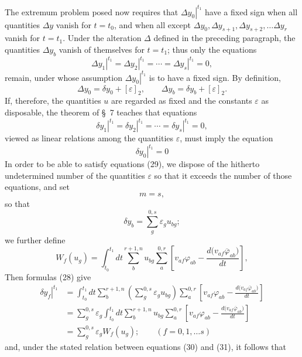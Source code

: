 \documentclass[11pt,a4paper,leqno]{article}
\begin{document}
The extremum problem posed now requires that $\left.\Delta y_0\right|^{t_1}$ have a fixed sign when all quantities $\Delta y$ vanish for $t=t_0$, and when all except $\Delta y_0,\Delta y_{s+1},\Delta y_{s+2},\ldots\Delta y_r$ vanish for $t=t_1$. Under the alteration $\Delta$ defined in the preceding paragraph, the quantities $\Delta y_b$ vanish of themselves for $t=t_1$; thus only the equations
\begin{equation}\tag{29}
\left.\Delta y_1\right|^{t_1}
=\left.\Delta y_2\right|^{t_1}
=\cdots
=\left.\Delta y_s\right|^{t_1}=0,
\end{equation}
remain, under whose assumption $\left.\Delta y_0\right|^{t_1}$ is to have a fixed sign. By definition,
\[
\Delta y_0=\delta y_0+[\varepsilon]_2,
\qquad
\Delta y_b=\delta y_b+[\varepsilon]_2.
\]
If, therefore, the quantities $u$ are regarded as fixed and the constants $\varepsilon$ as disposable, the theorem of \S~7 teaches that equations
\begin{equation}\tag{30}
\left.\delta y_1\right|^{t_1}
=\left.\delta y_2\right|^{t_1}
=\cdots
=\left.\delta y_s\right|^{t_1}=0,
\end{equation}
viewed as linear relations among the quantities $\varepsilon$, must imply the equation
\begin{equation}\tag{31}
\left.\delta y_0\right|^{t_1}=0
\end{equation}
In order to be able to satisfy equations (29), we dispose of the hitherto undetermined number of the quantities $\varepsilon$ so that it exceeds the number of those equations, and set
\[
m=s,
\]
so that
\[
\delta y_b=\sum_g^{0,s}\varepsilon_g u_{bg};
\]
we further define
\[
W_f(u_g)=
\int_{t_0}^{t_1}dt\sum_b^{r+1,n}u_{bg}\sum_a^{0,r}
\left[
v_{af}\varphi_{ab}-\frac{d\bigl(v_{af}\overline{\varphi}_{ab}\bigr)}{dt}
\right],
\]
Then formulas (28) give
\begin{align*}
\left.\delta y_f\right|^{t_1}
&=
\int_{t_0}^{t_1}dt\sum_b^{r+1,n}
\left(\sum_g^{0,s}\varepsilon_gu_{bg}\right)
\sum_a^{0,r}
\left[
v_{af}\varphi_{ab}-\frac{d\bigl(v_{af}\overline{\varphi}_{ab}\bigr)}{dt}
\right]\\
&=
\sum_g^{0,s}\varepsilon_g
\int_{t_0}^{t_1}dt\sum_b^{r+1,n}u_{bg}\sum_a^{0,r}
\left[
v_{af}\varphi_{ab}-\frac{d\bigl(v_{af}\overline{\varphi}_{ab}\bigr)}{dt}
\right]\\
&=
\sum_g^{0,s}\varepsilon_gW_f(u_g);
\qquad(f=0,1,\ldots s)
\end{align*}
and, under the stated relation between equations (30) and (31), it follows that
\end{document}
